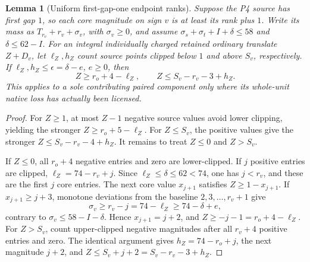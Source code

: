 \documentclass[11pt,letterpaper]{article}
\newtheorem{lemma}[theorem]{Lemma}
\theoremstyle{definition}\newtheorem{definition}[theorem]{Definition}
\begin{document}
\begin{lemma}[Uniform first-gap-one endpoint ranks]\label{lem:common-endpoint}
Suppose the P4 source has first gap $1$, so each core magnitude on
sign $v$ is at least its rank plus $1$. Write its mass as
$T_{r_v}+r_v+\sigma_v$, with $\sigma_v\ge0$, and assume
$\sigma_s+\sigma_t+I+\delta\le58$ and $\delta\le62-I$.
For an integral individually charged retained ordinary translate
$Z+D_v$, let $\ell_Z,h_Z$ count source points clipped below $1$
and above $S_v$, respectively. If
$\ell_Z,h_Z\le\epsilon=\delta-e$, $e\ge0$, then
\begin{equation}\label{eq:common-END1}
Z\ge r_o+4-\ell_Z,\qquad
Z\le S_v-r_v-3+h_Z.
\end{equation}
This applies to a sole contributing paired component only where its
whole-unit native loss has actually been licensed.
\end{lemma}
\begin{proof}
For $Z\ge1$, at most $Z-1$ negative source values avoid lower
clipping, yielding the stronger $Z\ge r_o+5-\ell_Z$.
For $Z\le S_v$, the positive values give the stronger
$Z\le S_v-r_v-4+h_Z$. It remains to treat $Z\le0$ and $Z>S_v$.

If $Z\le0$, all $r_o+4$ negative entries and zero are lower-clipped.
If $j$ positive entries are clipped, $\ell_Z=74-r_v+j$.
Since $\ell_Z\le\delta\le62<74$, one has $j<r_v$, and these are
the first $j$ core entries. The next core value $x_{j+1}$ satisfies
$Z\ge1-x_{j+1}$. If $x_{j+1}\ge j+3$, monotone deviations from
the baseline $2,3,\ldots,r_v+1$ give
\[
\sigma_v\ge r_v-j=74-\ell_Z\ge74-\delta+e,
\]
contrary to $\sigma_v\le58-I-\delta$. Hence $x_{j+1}=j+2$,
and $Z\ge-j-1=r_o+4-\ell_Z$.
For $Z>S_v$, count upper-clipped negative magnitudes after all
$r_v+4$ positive entries and zero. The identical argument gives
$h_Z=74-r_o+j$, the next magnitude $j+2$, and
$Z\le S_v+j+2=S_v-r_v-3+h_Z$.
\end{proof}
\end{document}
